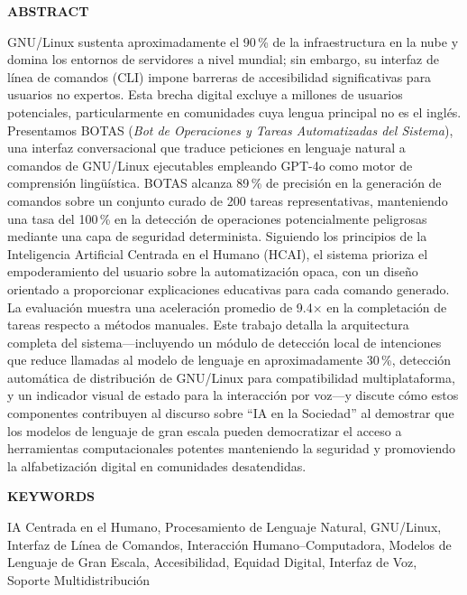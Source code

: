 \documentclass[10pt,a4paper]{article}
\begin{document}
{
\vspace{18pt}
\noindent\fontsize{9}{10.8}\bfseries ABSTRACT\par
\vspace{6pt}
\fontsize{9}{10.8}\selectfont
\noindent
GNU/Linux sustenta aproximadamente el 90\,\% de la infraestructura en la nube y domina los entornos de servidores a nivel mundial; sin embargo, su interfaz de l\'{i}nea de comandos (CLI) impone barreras de accesibilidad significativas para usuarios no expertos. Esta brecha digital excluye a millones de usuarios potenciales, particularmente en comunidades cuya lengua principal no es el ingl\'{e}s. Presentamos BOTAS (\textit{Bot de Operaciones y Tareas Automatizadas del Sistema}), una interfaz conversacional que traduce peticiones en lenguaje natural a comandos de GNU/Linux ejecutables empleando GPT-4o como motor de comprensi\'{o}n ling\"{u}\'{i}stica. BOTAS alcanza 89\,\% de precisi\'{o}n en la generaci\'{o}n de comandos sobre un conjunto curado de 200 tareas representativas, manteniendo una tasa del 100\,\% en la detecci\'{o}n de operaciones potencialmente peligrosas mediante una capa de seguridad determinista. Siguiendo los principios de la Inteligencia Artificial Centrada en el Humano (HCAI), el sistema prioriza el empoderamiento del usuario sobre la automatizaci\'{o}n opaca, con un dise\~{n}o orientado a proporcionar explicaciones educativas para cada comando generado. La evaluaci\'{o}n muestra una aceleraci\'{o}n promedio de 9.4$\times$ en la completaci\'{o}n de tareas respecto a m\'{e}todos manuales. Este trabajo detalla la arquitectura completa del sistema---incluyendo un m\'{o}dulo de detecci\'{o}n local de intenciones que reduce llamadas al modelo de lenguaje en aproximadamente 30\,\%, detecci\'{o}n autom\'{a}tica de distribuci\'{o}n de GNU/Linux para compatibilidad multiplataforma, y un indicador visual de estado para la interacci\'{o}n por voz---y discute c\'{o}mo estos componentes contribuyen al discurso sobre ``IA en la Sociedad'' al demostrar que los modelos de lenguaje de gran escala pueden democratizar el acceso a herramientas computacionales potentes manteniendo la seguridad y promoviendo la alfabetizaci\'{o}n digital en comunidades desatendidas.\par
}

{
\vspace{18pt}
\noindent\fontsize{9}{10.8}\bfseries KEYWORDS\par
\vspace{6pt}
\fontsize{10}{12}\selectfont
\noindent
IA Centrada en el Humano, Procesamiento de Lenguaje Natural, GNU/Linux, Interfaz de L\'{i}nea de Comandos, Interacci\'{o}n Humano--Computadora, Modelos de Lenguaje de Gran Escala, Accesibilidad, Equidad Digital, Interfaz de Voz, Soporte Multidistribuci\'{o}n\par
}
\end{document}

